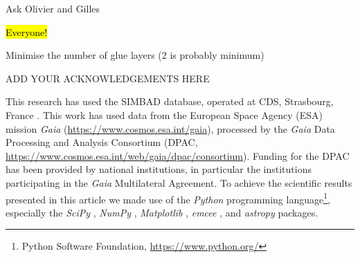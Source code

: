 \documentclass{aa}
\begin{document}
Ask Olivier and Gilles

\hl{Everyone!}

Minimise the number of glue layers (2 is probably minimum)



\begin{acknowledgements}

ADD YOUR ACKNOWLEDGEMENTS HERE

This research has used the SIMBAD database, operated at CDS, Strasbourg, France \citep{wenger2000}.
%
This work has used data from the European Space Agency (ESA) mission {\it Gaia} (\url{https://www.cosmos.esa.int/gaia}), processed by the {\it Gaia} Data Processing and Analysis Consortium (DPAC, \url{https://www.cosmos.esa.int/web/gaia/dpac/consortium}).
%
Funding for the DPAC has been provided by national institutions, in particular the institutions participating in the {\it Gaia} Multilateral Agreement.
%
To achieve the scientific results presented in this article we made use of the \emph{Python} programming language\footnote{Python Software Foundation, \url{https://www.python.org/}}, especially the \emph{SciPy} \citep{virtanen2020}, \emph{NumPy} \citep{numpy}, \emph{Matplotlib} \citep{Matplotlib}, \emph{emcee} \citep{foreman-mackey2013}, and \emph{astropy} \citep{astropy_1,astropy_2} packages.
%
\end{acknowledgements}



\end{document}
